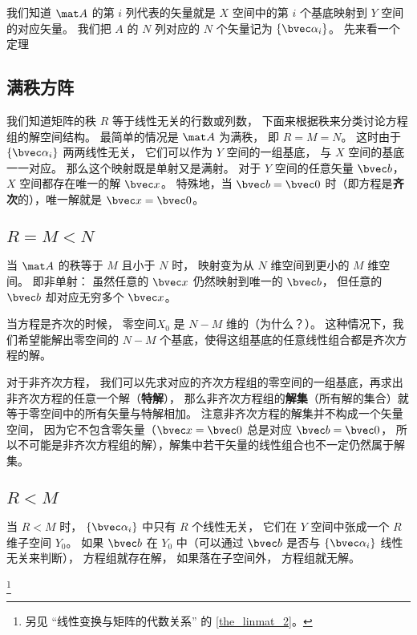我们知道 $\mat A$ 的第 $i$ 列代表的矢量就是 $X$ 空间中的第 $i$ 个基底映射到 $Y$ 空间的对应矢量。 我们把 $A$ 的 $N$ 列对应的 $N$ 个矢量记为 $\{\bvec \alpha_i\}$。 先来看一个定理

\subsection{满秩方阵}
我们知道矩阵的秩 $R$ 等于线性无关的行数或列数， 下面来根据秩来分类讨论方程组的解空间结构。 最简单的情况是 $\mat A$ 为满秩， 即 $R = M = N$。 这时由于 $\{\bvec \alpha_i\}$ 两两线性无关， 它们可以作为 $Y$ 空间的一组基底， 与 $X$ 空间的基底一一对应。 那么这个映射既是单射又是满射。%
对于 $Y$ 空间的任意矢量 $\bvec b$， $X$ 空间都存在唯一的解 $\bvec x$。 特殊地，当 $\bvec b = \bvec 0$ 时（即方程是\textbf{齐次}的），唯一解就是 $\bvec x = \bvec 0$。

\subsection{$R = M < N$}\label{sub_LinEq_1}

当 $\mat A$ 的秩等于 $M$ 且小于 $N$ 时， 映射变为从 $N$ 维空间到更小的 $M$ 维空间。 即非单射： 虽然任意的 $\bvec x$ 仍然映射到唯一的 $\bvec b$， 但任意的 $\bvec b$ 却对应无穷多个 $\bvec x$。 


当方程是齐次的时候， 零空间$X_0$ 是 $N- M$ 维的（为什么？）。 这种情况下，我们希望能解出零空间的 $N - M$ 个基底，使得这组基底的任意线性组合都是齐次方程的解。

对于非齐次方程， 我们可以先求对应的齐次方程组的零空间的一组基底，再求出非齐次方程的任意一个解（\textbf{特解}）， 那么非齐次方程组的\textbf{解集}（所有解的集合）就等于零空间中的所有矢量与特解相加。 注意非齐次方程的解集并不构成一个矢量空间， 因为它不包含零矢量（$\bvec x = \bvec 0$ 总是对应 $\bvec b = \bvec 0$， 所以不可能是非齐次方程组的解），解集中若干矢量的线性组合也不一定仍然属于解集。

\subsection{$R < M$}
当 $R < M$ 时， $\{\bvec \alpha_i\}$ 中只有 $R$ 个线性无关， 它们在 $Y$ 空间中张成一个 $R$ 维子空间 $Y_0$。 如果 $\bvec b$ 在 $Y_0$ 中（可以通过 $\bvec b$ 是否与 $\{\bvec \alpha_i\}$ 线性无关来判断）， 方程组就存在解， 如果落在子空间外， 方程组就无解。

\footnote{另见 “线性变换与矩阵的代数关系” 的 \autoref{the_linmat_2}。}

